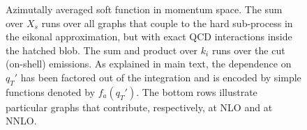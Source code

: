 \documentclass{appolb}
\begin{document}
\begin{figure}[htb]
\caption{Azimutally averaged soft function in momentum space. The sum over $X_s$ runs over all graphs that couple to the hard sub-process in the eikonal approximation, but with exact QCD interactions inside the hatched blob. The sum and product over $k_i$ runs over the cut (on-shell) emissions.  As explained in main text, the 
dependence on $q_T'$ has been factored out of the integration and is encoded by simple functions denoted by
$f_a(q_T')$.  The bottom rows illustrate particular graphs that contribute, respectively, at NLO and at NNLO. }
\label{fig:soft_function}
\end{figure}
\end{document}
